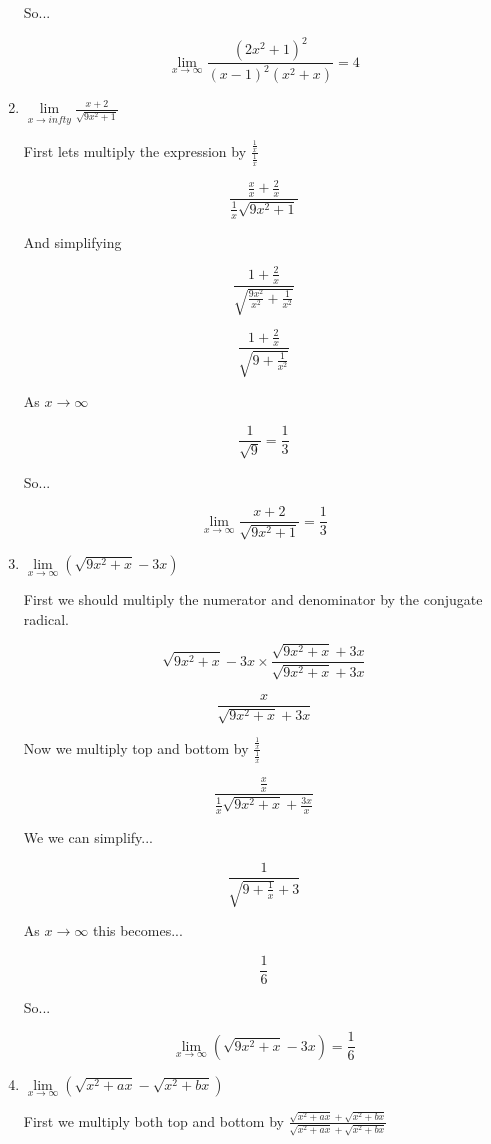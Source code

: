 \documentclass{article}
\begin{document}
\begin{enumerate}
			So...

			$$\lim \limits _{x \to \infty} \frac{(2x^2 + 1)^2}{(x-1)^2(x^2+x)} = 4$$

		\item $\lim \limits _{x \to infty} \frac{x + 2}{\sqrt{9x^2 + 1}}$

			First lets multiply the expression by $\frac{ \frac{1}{x} }{ \frac{1}{x} }$

			$$\frac{ \frac{x}{x} + \frac{2}{x} }{ \frac{1}{x} \sqrt{9x^2 + 1}}$$

			And simplifying

			$$\frac{ 1 + \frac{2}{x} }{ \sqrt{\frac{9x^2}{x^2} + \frac{1}{x^2}}}$$

			$$\frac{1 + \frac{2}{x}}{ \sqrt{ 9 + \frac{1}{x^2}}}$$

			As $x \to \infty$

			$$\frac{1}{\sqrt{9}} = \frac{1}{3}$$

			So...

			$$\lim \limits _{x \to \infty} \frac{x + 2}{\sqrt{9x^2 + 1}} = \frac{1}{3}$$

		\item $\lim \limits _{x \to \infty} ( \sqrt{9x^2 + x} - 3x )$

			First we should multiply the numerator and denominator by the conjugate radical.

			$$\sqrt{9x^2 + x} - 3x \times \frac{\sqrt{9x^2 + x} + 3x}{\sqrt{9x^2 + x} + 3x}$$

			$$\frac{x}{\sqrt{9x^2 + x} + 3x}$$

			Now we multiply top and bottom by $\frac{ \frac{1}{x} }{ \frac{1}{x} }$

			$$\frac{ \frac{x}{x} }{ \frac{1}{x}\sqrt{9x^2 + x} + \frac{3x}{x}}$$

			We we can simplify...

			$$\frac{1}{ \sqrt{9 + \frac{1}{x}} + 3}$$

			As $x \to \infty$ this becomes...

			$$\frac{1}{6}$$

			So...

			$$\lim \limits _{x \to \infty} (\sqrt{9x^2 + x} - 3x) = \frac{1}{6}$$

		\item $\lim \limits _{x \to \infty} (\sqrt{x^2 + ax} - \sqrt{x^2 + bx})$

			First we multiply both top and bottom by $\frac{\sqrt{x^2 + ax} + \sqrt{x^2 + bx}}{ \sqrt{x^2 + ax} + \sqrt{x^2 + bx}}$


\end{enumerate}
\end{document}
